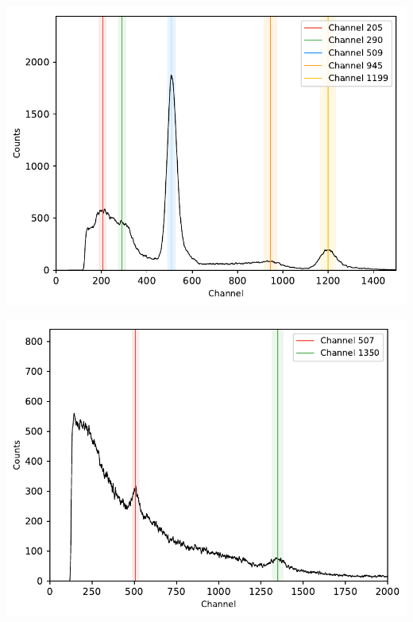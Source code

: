 \begin{multicols}{2}
\begin{center}
\begin{adjustbox}{max width=\linewidth, keepaspectratio}
        \end{adjustbox}
        \label{fig:Spectrum133Ba}
    \end{center}
\endminipage
%
\vspace{10mm}
%
\minipage{\linewidth}
    \begin{center}
        \captionsetup{type=figure}
        \begin{adjustbox}{max width=\linewidth, keepaspectratio}
            \includegraphics[]{pdf/22Na}
        \end{adjustbox}
        \label{fig:Spectrum22Na}
    \end{center}
\endminipage
%
\vspace{10mm}
%
\minipage{\linewidth}
    \begin{center}
        \captionsetup{type=figure}
        \begin{adjustbox}{max width=\linewidth, keepaspectratio}
            \includegraphics[]{pdf/night}

\end{adjustbox}
\end{center}
\end{multicols}
